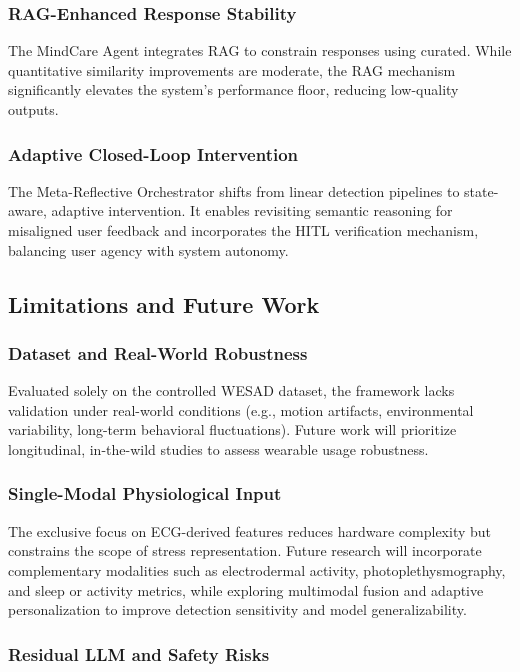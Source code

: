 \documentclass[journal,twoside,web]{ieeecolor}
\begin{document}
\subsubsection{RAG-Enhanced Response Stability}

The MindCare Agent integrates RAG to constrain responses using curated. While quantitative similarity improvements are moderate, the RAG mechanism significantly elevates the system’s performance floor, reducing low-quality outputs.

\subsubsection{Adaptive Closed-Loop Intervention}

 The Meta-Reflective Orchestrator shifts from linear detection pipelines to state-aware, adaptive intervention. It enables revisiting semantic reasoning for misaligned user feedback and incorporates the HITL verification mechanism, balancing user agency with system autonomy. 
 
\subsection{Limitations and Future Work}
\subsubsection{Dataset and Real-World Robustness}

 Evaluated solely on the controlled WESAD dataset, the framework lacks validation under real-world conditions (e.g., motion artifacts, environmental variability, long-term behavioral fluctuations). Future work will prioritize longitudinal, in-the-wild studies to assess wearable usage robustness.
 
 \subsubsection{Single-Modal Physiological Input}
 
The exclusive focus on ECG-derived features reduces hardware complexity but constrains the scope of stress representation. Future research will incorporate complementary modalities such as electrodermal activity, photoplethysmography, and sleep or activity metrics, while exploring multimodal fusion and adaptive personalization to improve detection sensitivity and model generalizability.

 \subsubsection{Residual LLM and Safety Risks}
\end{document}
